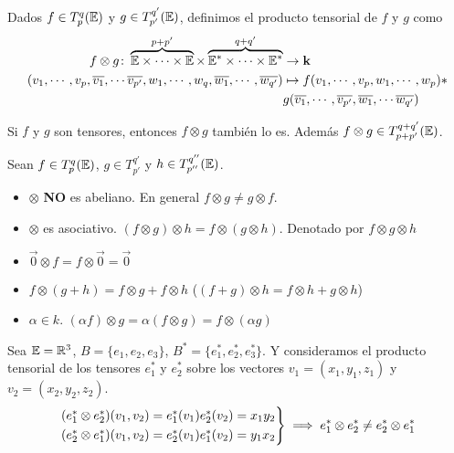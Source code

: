 \begin{defi}
	Dados $f \in T_p^q(\mathbb{E})$ y $g \in T_{p'}^{q'}(\mathbb{E})$, definimos el producto
	tensorial de $f$ y $g$ como
	\[
		\begin{aligned}
			f \otimes g \colon \overbrace{\mathbb{E} \times \cdots \times \mathbb{E}}^{p+p'}
			\times \overbrace{\mathbb{E}^* \times \cdots \times \mathbb{E}^*}^{q+q'} &\to \mathbf{k} \\
			(v_1, \cdots, v_p, \overline{v_1}, \cdots \overline{v_{p'}},
			w_1, \cdots, w_q, \overline{w_1}, \cdots, \overline{w_{q'}})
			&\mapsto f(v_1, \cdots, v_p, w_1, \cdots, w_p) * \\
			&g(\overline{v_1}, \cdots, \overline{v_{p'}}, \overline{w_1}, \cdots
			\overline{w_{q'}})
		\end{aligned}
	\]
\end{defi}
\begin{obs}
	Si $f$ y $g$ son tensores, entonces $f \otimes g$ también lo es. Además
	$f \otimes g \in T_{p+p'}^{q+q'}(\mathbb{E})$.
\end{obs}
\begin{prop}
	Sean  $f \in T_p^q(\mathbb{E})$, $g \in T_{p'}^{q'}$ y $h \in T_{p''}^{q''}(\mathbb{E})$.
	\begin{itemize}
		\item $\otimes$ {\bfseries NO} es abeliano. En general $f \otimes g \neq
		g \otimes f$.
		\item $\otimes$ es asociativo. $(f \otimes g) \otimes h = f \otimes (g
		\otimes h)$. Denotado por $f \otimes g \otimes h$
		\item $\vec{0} \otimes f = f \otimes \vec{0} = \vec{0}$
		\item $f \otimes (g + h) = f \otimes g + f\otimes h$ \quad ($(f+g) \otimes
		h = f \otimes h + g \otimes h$)
		\item $\alpha \in k$. $(\alpha f) \otimes g = \alpha(f \otimes g) =
		f \otimes (\alpha g)$
	\end{itemize}
\end{prop}
\begin{example}
	Sea $\mathbb{E} = \mathbb{R}^3$, $B = \{e_1, e_2, e_3\}$, $B^* = \{ e_1^*, e_2^*, e_3^*\}$.
	Y consideramos el producto tensorial de los tensores $e_1^*$ y $e_2^*$ sobre
	los vectores $v_1 = (x_1, y_1, z_1)$ y $v_2 = (x_2,y_2,z_2)$.
	\[
		\begin{rcases}
			(e_1^* \otimes e_2^*)(v_1, v_2) = e_1^*(v_1)e_2^*(v_2) = x_1y_2 \\
			(e_2^* \otimes e_1^*)(v_1, v_2) = e_2^*(v_1)e_1^*(v_2) = y_1x_2
		\end{rcases}
		\implies e_1^* \otimes e_2^* \neq e_2^* \otimes e_1^*
	\]
\end{example}
